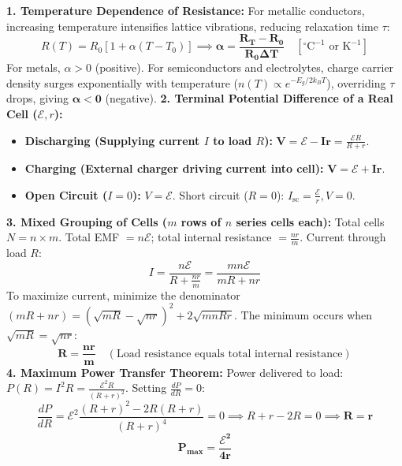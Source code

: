 \documentclass[10pt,twoside,openright]{book}
\begin{document}
\begin{formulabox}
\textbf{1. Temperature Dependence of Resistance:}
For metallic conductors, increasing temperature intensifies lattice vibrations, reducing relaxation time $\tau$:
\begin{equation}
  R(T) = R_0 [1 + \alpha (T - T_0)] \implies \mathbf{\alpha = \frac{R_T - R_0}{R_0 \Delta T}} \quad [^\circ\mathrm{C}^{-1} \text{ or } \mathrm{K}^{-1}]
\end{equation}
For metals, $\alpha > 0$ (positive). For semiconductors and electrolytes, charge carrier density surges exponentially with temperature ($n(T) \propto e^{-E_g / 2k_B T}$), overriding $\tau$ drops, giving $\mathbf{\alpha < 0}$ (negative).
\textbf{2. Terminal Potential Difference of a Real Cell ($\mathcal{E}, r$):}
\begin{itemize}
  \item \textbf{Discharging (Supplying current $I$ to load $R$):} $\mathbf{V = \mathcal{E} - I r} = \frac{\mathcal{E} R}{R + r}$.
  \item \textbf{Charging (External charger driving current into cell):} $\mathbf{V = \mathcal{E} + I r}$.
  \item \textbf{Open Circuit ($I=0$):} $V = \mathcal{E}$. Short circuit ($R=0$): $I_{\text{sc}} = \frac{\mathcal{E}}{r}, V = 0$.
\end{itemize}
\textbf{3. Mixed Grouping of Cells ($m$ rows of $n$ series cells each):}
Total cells $N = n \times m$. Total EMF $= n\mathcal{E}$; total internal resistance $= \frac{n r}{m}$.
Current through load $R$:
\begin{equation}
  I = \frac{n\mathcal{E}}{R + \frac{n r}{m}} = \frac{m n \mathcal{E}}{m R + n r}
\end{equation}
To maximize current, minimize the denominator $(mR + nr) = (\sqrt{mR} - \sqrt{nr})^2 + 2\sqrt{mnRr}$.
The minimum occurs when $\sqrt{mR} = \sqrt{nr}$:
\begin{equation}
  \mathbf{R = \frac{n r}{m}} \quad (\text{Load resistance equals total internal resistance})
\end{equation}
\textbf{4. Maximum Power Transfer Theorem:}
Power delivered to load: $P(R) = I^2 R = \frac{\mathcal{E}^2 R}{(R + r)^2}$. Setting $\frac{dP}{dR} = 0$:
\begin{equation}
  \frac{dP}{dR} = \mathcal{E}^2 \frac{(R + r)^2 - 2R(R + r)}{(R + r)^4} = 0 \implies R + r - 2R = 0 \implies \mathbf{R = r}
\end{equation}
\begin{equation}
  \mathbf{P_{\max} = \frac{\mathcal{E}^2}{4r}}
\end{equation}
\end{formulabox}
\end{document}
